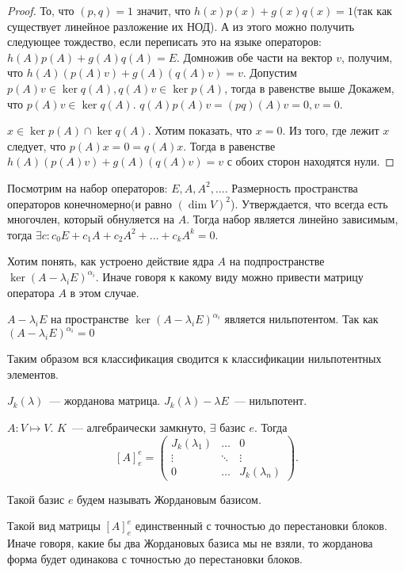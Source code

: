\begin{proof}
    То, что $(p,q) = 1$ значит, что 
    $h(x)p(x) + g(x)q(x) = 1$(так как существует линейное разложение их НОД).
    А из этого можно получить следующее тождество, если переписать это на языке операторов: $h(A)p(A) + g(A) q(A) = E$.
    Домножив обе части на вектор $v$, получим, что $h(A)(p(A)v) + g(A)(q(A)v) = v$.
    Допустим $p(A)v\in \ker q(A), q(A)v\in \ker p(A)$, тогда в равенстве выше 
    Докажем, что $p(A)v\in \ker q(A)$. $q(A)p(A)v = (pq)(A)v = 0, v = 0$.

    $x\in \ker p(A)\cap \ker q(A)$. Хотим показать, что $x = 0$.
    Из того, где лежит  $x$ следует, что $p(A)x = 0 = q(A)x$.
    Тогда в равенстве $h(A)(p(A)v) + g(A)(q(A)v) = v$ с обоих сторон находятся нули.
\end{proof}
\begin{remark}
    Посмотрим на набор операторов: $E, A, A^2, \dots$. Размерность пространства операторов конечномерно(и равно $(\dim V)^2$).
    Утверждается, что всегда есть многочлен, который обнуляется на $A$.
    Тогда набор является линейно зависимым, тогда $\exists c\colon c_0E + c_1A + c_2A^2 + \dots +c_k A^k = 0$.
\end{remark}
\begin{motivation}
    Хотим понять, как устроено действие ядра $A$ на подпространстве $\ker (A - \lambda_iE)^{\alpha_i}$.
    Иначе говоря к какому виду можно привести матрицу оператора $A$ в этом случае.
\end{motivation}
\begin{remark}
    $A - \lambda_iE$ на пространстве $\ker(A - \lambda_iE)^{\alpha_i}$ является нильпотентом.
    Так как $(A - \lambda_iE)^{\alpha_i} = 0$
\end{remark}
\begin{motivation}
    Таким образом вся классификация сводится к классификации нильпотентных элементов.
\end{motivation}
\begin{remark}
    $J_k(\lambda)$~--- жорданова матрица.
    $J_k(\lambda) - \lambda E$~--- нильпотент.
\end{remark}
\begin{theorem}
    $A\colon V\mapsto V$. $K$~--- алгебраически замкнуто, $\exists$ базис $e$.
    Тогда 
     \[
         [A]^e_e =
         \begin{pmatrix}
             J_k(\lambda_1) & \dots & 0\\
             \vdots & \ddots & \vdots\\
             0 & \dots & J_k(\lambda_n)
         \end{pmatrix}
    .\] 
    \begin{definition}
        Такой базис $e$ будем называть Жордановым базисом.
    \end{definition}
    Такой вид матрицы $[A]^e_e$ единственный с точностью до перестановки блоков.
    Иначе говоря, какие бы два Жордановых базиса мы не взяли, то жорданова форма будет одинакова с точностью до перестановки блоков.
\end{theorem}
